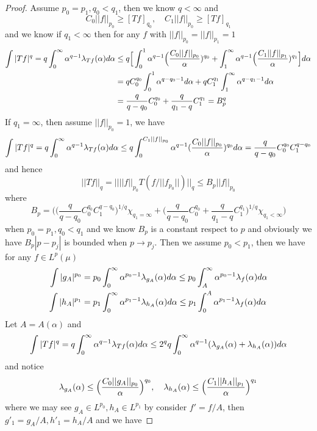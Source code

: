 \begin{proof}\par
    Assume $p_0 = p_1,q_0 < q_1$, then we know $q<\infty$ and
    \[C_0||f||_{p_0} \geq [Tf]_{q_0},\quad C_1||f||_{p_0}\geq [Tf]_{q_1}\]
    and we know if $q_1 < \infty$ then for any $f$ with $||f||_{p_0} = ||f||_{p_1} = 1$
    \[
    \begin{aligned}
    \int |Tf|^q = q\int_0^{\infty} \alpha^{q-1}\lambda_{Tf}(\alpha)d\alpha &\leq q\Big[\int_0^1 \alpha^{q-1}\Big(\dfrac{C_0||f||_{p_0}}{\alpha})^{q_0}+\int_1^{\infty} \alpha^{q-1}\Big(\dfrac{C_1||f||_{p_1}}{\alpha})^{q_1}\Big] d\alpha\\
    &= qC_0^{q_0} \int_0^1 \alpha^{q-q_0-1}d\alpha + qC_1^{q_1} \int_1^{\infty} \alpha^{q-q_1-1}d\alpha \\
    & = \dfrac{q}{q-q_0}C_0^{q_0} + \dfrac{q}{q_1-q}C_1^{q_1} = B_p^{q}
    \end{aligned}
    \]
    If $q_1 = \infty$, then assume $||f||_{p_0} = 1$, we have
    \[
        \int |Tf|^q = q\int_0^{\infty} \alpha^{q-1}\lambda_{Tf}(\alpha)d\alpha \leq q\int_0^{C_1||f||_{p_0}} \alpha^{q-1}(\dfrac{C_0||f||_{p_0}}{\alpha})^{q_0}d\alpha = \dfrac{q}{q-q_0}C_0^{q_0}C_1^{q-q_0}
    \]
    and hence
    \[
    ||Tf||_q = ||||f||_{p_0} T(f/||f_{p_0}||)||_q \leq  B_p||f||_{p_0}
    \]
    where
    \[B_p = \Big(\Big(\dfrac{q}{q-q_0}C_0^{q_0}C_1^{q-q_0}\Big)^{1/q}\chi_{q_1 = \infty} +  \Big(\dfrac{q}{q-q_0}C_0^{q_0} + \dfrac{q}{q_1-q}C_1^{q_1}\Big)^{1/q}\chi_{q_1 < \infty}\Big)\]
    when $p_0 = p_1, q_0 < q_1$ and we know $B_p$ is a constant respect to $p$ and obviously we have $B_p|p-p_j|$ is bounded when $p\to p_j$. Then we assume $p_0<p_1$, then we have for any $f\in L^p(\mu)$
    \[
    \begin{aligned}
        \int |g_A|^{p_0} &= p_0\int_0^{\infty} \alpha^{p_0-1}\lambda_{g_A}(\alpha)d\alpha \leq p_0 \int_A^{\infty}\alpha^{p_0-1}\lambda_{f}(\alpha)d\alpha\\
        \int |h_A|^{p_1} &= p_1\int_0^{\infty} \alpha^{p_1-1}\lambda_{h_A}(\alpha)d\alpha \leq p_1\int_0^A \alpha^{p_1-1}\lambda_{f}(\alpha)d\alpha
    \end{aligned}
    \]
    Let $A = A(\alpha)$ and
    \[
    \int |Tf|^q = q \int_0^{\infty} \alpha^{q-1}\lambda_{Tf}(\alpha) d\alpha \leq 2^qq\int_0^{\infty}\alpha^{q-1}(\lambda_{g_A}(\alpha)+\lambda_{h_A}(\alpha))d\alpha
    \]
    and notice
    \[
        \lambda_{g_A}(\alpha) \leq \Big(\dfrac{C_0||g_A||_{p_0}}{\alpha}\Big)^{q_0},\quad \lambda_{h_A}(\alpha) \leq \Big(\dfrac{C_1||h_A||_{p_1}}{\alpha}\Big)^{q_1}
    \]
    where we may see $g_A \in L^{p_0}, h_A \in L^{p_1}$ by consider $f' = f/A$, then $g'_1 = g_A/A, h'_1 = h_A/A$ and we have

\end{proof}
